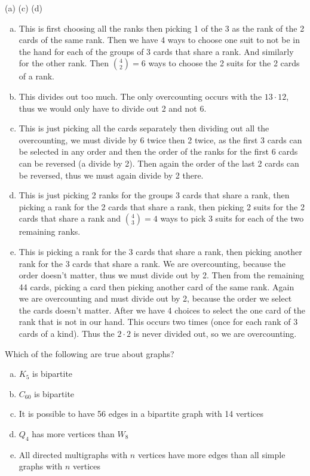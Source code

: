 \begin{solution}

(a) (c) (d)
\begin{enumerate}[(a)]
\item This is first choosing all the ranks then picking 1 of the 3 as the rank of the 2 cards of the same rank. Then we have 4 ways to choose one suit to not be in the hand for each of the groups of 3 cards that share a rank. And similarly for the other rank. Then $\binom{4}{2}=6$ ways to choose the 2 suits for the 2 cards of a rank.
\item This divides out too much. The only overcounting occurs with the $13\cdot 12$, thus we would only have to divide out 2 and not 6.
\item This is just picking all the cards separately then dividing out all the overcounting, we must divide by 6 twice then 2 twice, as the first 3 cards can be selected in any order and then the order of the ranks for the first 6 cards can be reversed (a divide by 2). Then again the order of the last 2 cards can be reversed, thus we must again divide by 2 there.
\item This is just picking 2 ranks for the groups 3 cards that share a rank, then picking a rank for the 2 cards that share a rank, then picking 2 suits for the 2 cards that share a rank and $\binom{4}{3}=4$ ways to pick 3 suits for each of the two remaining ranks.
\item This is picking a rank for the 3 cards that share a rank, then picking another rank for the 3 cards that share a rank. We are overcounting, because the order doesn't matter, thus we must divide out by 2. Then from the remaining 44 cards, picking a card then picking another card of the same rank. Again we are overcounting and must divide out by 2, because the order we select the cards doesn't matter. After we have 4 choices to select the one card of the rank that is not in our hand. This occurs two times (once for each rank of 3 cards of a kind). Thus the $2\cdot 2$ is never divided out, so we are overcounting.
\end{enumerate}

\end{solution}


Which of the following are true about graphs?

\begin{enumerate}[a)]
    \item $K_5$ is bipartite
    \item $C_{60}$ is bipartite
    \item It is possible to have 56 edges in a bipartite graph with 14 vertices
    \item $Q_4$ has more vertices than $W_8$
    \item All directed multigraphs with $n$ vertices have more edges than all simple graphs with $n$ vertices 
\end{enumerate}

